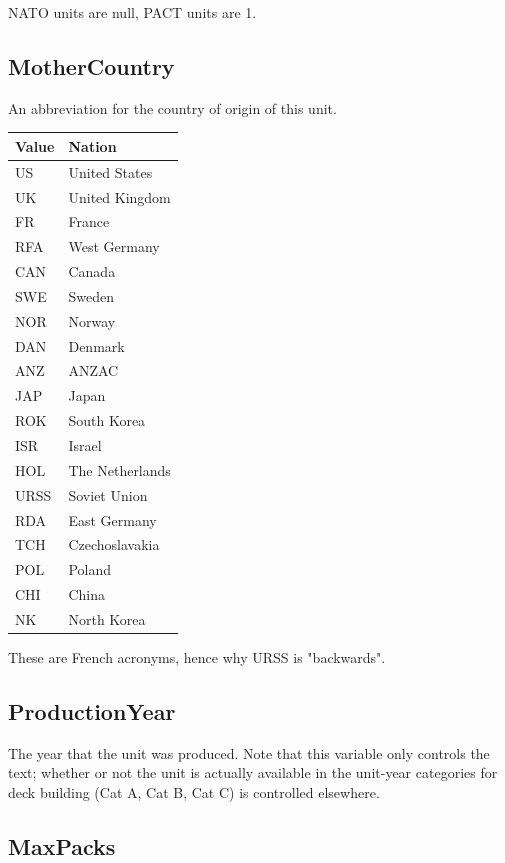 \documentclass{article}
\begin{document}
NATO units are null, PACT units are 1.

\subsection{MotherCountry}

An abbreviation for the country of origin of this unit.

\begin{center}
    \begin{tabular}{ | l | l |}
    \hline
	Value & Nation\\ \hline
	US & United States\\
	UK & United Kingdom\\
	FR & France\\
	RFA & West Germany\\
	CAN & Canada\\
	SWE & Sweden\\
	NOR & Norway\\
	DAN & Denmark\\
	ANZ & ANZAC\\
	JAP & Japan\\
	ROK & South Korea\\
	ISR & Israel\\
	HOL & The Netherlands\\
	URSS & Soviet Union\\
	RDA & East Germany\\
	TCH & Czechoslavakia\\
	POL & Poland\\
	CHI & China\\
	NK & North Korea\\
    \hline
    \end{tabular}
\end{center}

These are French acronyms, hence why URSS is "backwards".

\subsection{ProductionYear}

The year that the unit was produced. Note that this variable only controls the text; whether or not the unit is actually available in the unit-year categories for deck building (Cat A, Cat B, Cat C) is controlled elsewhere.

\subsection{MaxPacks}
\end{document}
